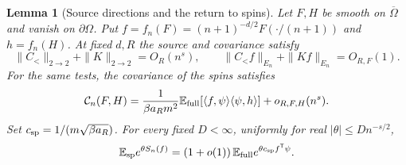 \documentclass[11pt]{article}
\numberwithin{equation}{section}
\newtheorem{lemma}[theorem]{Lemma}
\newcommand{\E}{\mathbb E}
\newcommand{\ip}[2]{\langle #1,#2\rangle}
\begin{document}
\begin{lemma}[Source directions and the return to spins]\label{lem:sources}
Let \(F,H\) be smooth on \(\overline\Omega\) and vanish on
\(\partial\Omega\). Put
\(f=f_n(F)=(n+1)^{-d/2} F(\cdot/(n+1))\) and \(h=f_n(H)\).
At fixed \(d,R\) the source and covariance satisfy
\begin{equation}
 \|C_<\|_{2\to2}+\|K\|_{2\to2}=O_R(n^s),\qquad
 \|C_< f\|_{E_n}+\|Kf\|_{E_n}=O_{R,F}(1).
\end{equation}
For the same tests, the covariance of the spins satisfies
\begin{equation}
 \mathcal C_n(F,H)=\frac{1}{\beta a_R m^2}
 \E_{\rm full}\!\left[\ip{f}{\psi}\ip{\psi}{h}\right]+o_{R,F,H}(n^s).
\end{equation}
Set $c_{\rm sp}=1/(m\sqrt{\beta a_R})$. For every
fixed $D<\infty$, uniformly for real $|\theta|\le D n^{-s/2}$,
\begin{equation}
 \E_{\rm sp}e^{\theta S_n(f)}
   =(1+o(1))\,\E_{\rm full}e^{\theta c_{\rm sp} f^{\mathsf T}\psi}.
 \label{eq:spin-laplace-transfer}
\end{equation}
\end{lemma}
\end{document}
